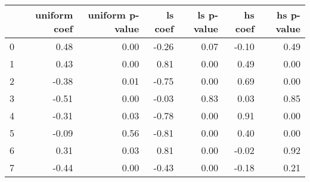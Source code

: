 \begin{tabular}{lrrrrrr}
\toprule
 & uniform coef & uniform p-value & ls coef & ls p-value & hs coef & hs p-value \\
\midrule
0 & 0.48 & 0.00 & -0.26 & 0.07 & -0.10 & 0.49 \\
1 & 0.43 & 0.00 & 0.81 & 0.00 & 0.49 & 0.00 \\
2 & -0.38 & 0.01 & -0.75 & 0.00 & 0.69 & 0.00 \\
3 & -0.51 & 0.00 & -0.03 & 0.83 & 0.03 & 0.85 \\
4 & -0.31 & 0.03 & -0.78 & 0.00 & 0.91 & 0.00 \\
5 & -0.09 & 0.56 & -0.81 & 0.00 & 0.40 & 0.00 \\
6 & 0.31 & 0.03 & 0.81 & 0.00 & -0.02 & 0.92 \\
7 & -0.44 & 0.00 & -0.43 & 0.00 & -0.18 & 0.21 \\
\bottomrule
\end{tabular}
